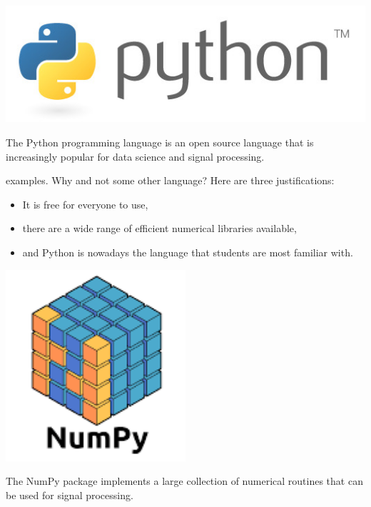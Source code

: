 \begin{marginfigure}
  \includegraphics[width=\textwidth]{ch02/figures/pylogo.jpg}
  \caption{The Python programming language is an open source language that is increasingly popular for data science and signal processing.}
\end{marginfigure}

 examples. Why  and not some other
language? Here are three justifications:
\begin{itemize}
  \item It is free for everyone to use,
  \item there are a wide range of efficient numerical libraries available,
  \item and Python is nowadays the language that students are most familiar with.
\end{itemize}

\begin{marginfigure}
  \begin{center}
    \includegraphics[width=0.5\textwidth]{ch02/figures/numpylogo.png}
  \end{center}
  \caption{The NumPy package implements a large collection of numerical routines that can be used for signal processing.}
\end{marginfigure}

